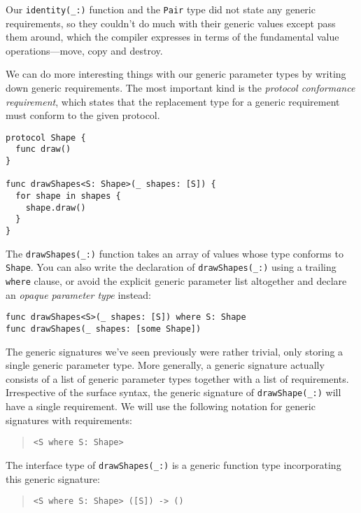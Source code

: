\documentclass[a4paper,headsepline,bibliography=totoc,toc=flat,fleqn,twoside=semi]{scrbook}
\theoremstyle{definition}
\theoremstyle{definition}
\theoremstyle{definition}
\begin{document}
Our \verb|identity(_:)| function and the \texttt{Pair} type did not state any generic requirements, so they couldn't do much with their generic values except pass them around, which the compiler expresses in terms of the fundamental value operations---move, copy and destroy.

We can do more interesting things with our generic parameter types by writing down generic requirements. The most important kind is the \emph{protocol conformance requirement}, which states that the replacement type for a generic requirement must conform to the given protocol.
\begin{Verbatim}
protocol Shape {
  func draw()
}

func drawShapes<S: Shape>(_ shapes: [S]) {
  for shape in shapes {
    shape.draw()
  }
}
\end{Verbatim}
The \verb|drawShapes(_:)| function takes an array of values whose type conforms to \texttt{Shape}. You can also write the declaration of \verb|drawShapes(_:)| using a trailing \texttt{where} clause, or avoid the explicit generic parameter list altogether and declare an \emph{opaque parameter type} instead:
\begin{Verbatim}
func drawShapes<S>(_ shapes: [S]) where S: Shape
func drawShapes(_ shapes: [some Shape])
\end{Verbatim}

The generic signatures we've seen previously were rather trivial, only storing a single generic parameter type. More generally, a generic signature actually consists of a list of generic parameter types together with a list of requirements. Irrespective of the surface syntax, the generic signature of \verb|drawShape(_:)| will have a single requirement. We will use the following notation for generic signatures with requirements:
\begin{quote}
\begin{verbatim}
<S where S: Shape>
\end{verbatim}
\end{quote}
The interface type of \verb|drawShapes(_:)| is a generic function type incorporating this generic signature:
\begin{quote}
\begin{verbatim}
<S where S: Shape> ([S]) -> ()
\end{verbatim}
\end{quote}
\end{document}
